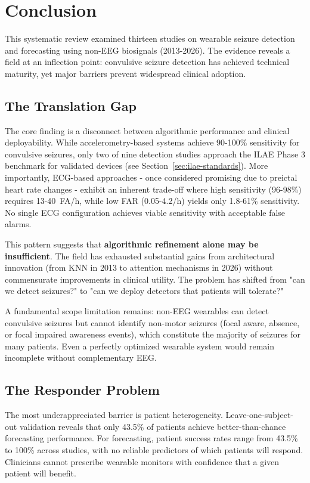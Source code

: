 \section{Conclusion}

This systematic review examined thirteen studies on wearable seizure detection and forecasting using non-EEG biosignals (2013-2026). The evidence reveals a field at an inflection point: convulsive seizure detection has achieved technical maturity, yet major barriers prevent widespread clinical adoption.

\subsection{The Translation Gap}

The core finding is a disconnect between algorithmic performance and clinical deployability. While accelerometry-based systems achieve 90-100\% sensitivity for convulsive seizures, only two of nine detection studies approach the ILAE Phase 3 benchmark for validated devices (see Section~\ref{sec:ilae-standards}). More importantly, ECG-based approaches - once considered promising due to preictal heart rate changes - exhibit an inherent trade-off where high sensitivity (96-98\%) requires 13-40~FA/h, while low FAR (0.05-4.2/h) yields only 1.8-61\% sensitivity. No single ECG configuration achieves viable sensitivity with acceptable false alarms.

This pattern suggests that \textbf{algorithmic refinement alone may be insufficient}. The field has exhausted substantial gains from architectural innovation (from KNN in 2013 to attention mechanisms in 2026) without commensurate improvements in clinical utility. The problem has shifted from "can we detect seizures?" to "can we deploy detectors that patients will tolerate?"

A fundamental scope limitation remains: non-EEG wearables can detect convulsive seizures but cannot identify non-motor seizures (focal aware, absence, or focal impaired awareness events), which constitute the majority of seizures for many patients. Even a perfectly optimized wearable system would remain incomplete without complementary EEG.

\subsection{The Responder Problem}

The most underappreciated barrier is patient heterogeneity. Leave-one-subject-out validation reveals that only 43.5\% of patients achieve better-than-chance forecasting performance. For forecasting, patient success rates range from 43.5\% to 100\% across studies, with no reliable predictors of which patients will respond. Clinicians cannot prescribe wearable monitors with confidence that a given patient will benefit.

